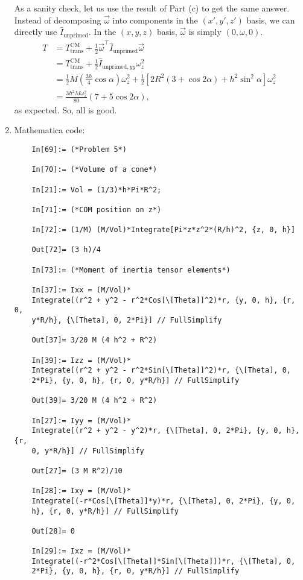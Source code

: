 \documentclass{article}
\theoremstyle{definition}
\newcommand{\al}{\alpha}
\newcommand{\f}[2]{\frac{#1}{#2}}
\newcommand{\lp}{\left(}
\newcommand{\rp}{\right)}
\newcommand{\lb}{\left[}
\newcommand{\rb}{\right]}
\begin{document}
\begin{enumerate}[label=(\alph*)]
	
	As a sanity check, let us use the result of Part (c) to get the same answer. Instead of decomposing $\vec{\omega}$ into components in the $(x',y',z')$ basis, we can directly use $\hat{I}_\text{unprimed}$. In the $(x,y,z)$ basis, $\vec{\omega}$ is simply $(0,\omega,0)$. 
	\begin{align*}
	T 
	&= T_{\text{trans}}^\text{CM} + \f{1}{2}\vec{\omega}^\top \hat{I}_\text{unprimed} \vec{\omega}\\
	&= T_{\text{trans}}^\text{CM} + \f{1}{2} \hat{I}_{\text{unprimed},yy}\omega_z^2\\
	&= \f{1}{2} M \lp \f{3h}{4}\cos\al \rp \omega_z^2 
	+ \f{1}{2}\lb 2R^2(3+\cos 2\al) + h^2 \sin^2\al \rb \omega_z^2 \\
	&= \f{3h^2 M \omega_z^2}{80}\lp 7 + 5\cos 2\al \rp,
	\end{align*}
	as expected. So, all is good.
	
	\item Mathematica code:
	\begin{lstlisting}
	In[69]:= (*Problem 5*)
	
	In[70]:= (*Volume of a cone*)
	
	In[21]:= Vol = (1/3)*h*Pi*R^2;
	
	In[71]:= (*COM position on z*)
	
	In[72]:= (1/M) (M/Vol)*Integrate[Pi*z*z^2*(R/h)^2, {z, 0, h}]
	
	Out[72]= (3 h)/4
	
	In[73]:= (*Moment of inertia tensor elements*)
	
	In[37]:= Ixx = (M/Vol)*
	Integrate[(r^2 + y^2 - r^2*Cos[\[Theta]]^2)*r, {y, 0, h}, {r, 0, 
	y*R/h}, {\[Theta], 0, 2*Pi}] // FullSimplify
	
	Out[37]= 3/20 M (4 h^2 + R^2)
	
	In[39]:= Izz = (M/Vol)*
	Integrate[(r^2 + y^2 - r^2*Sin[\[Theta]]^2)*r, {\[Theta], 0, 
	2*Pi}, {y, 0, h}, {r, 0, y*R/h}] // FullSimplify
	
	Out[39]= 3/20 M (4 h^2 + R^2)
	
	In[27]:= Iyy = (M/Vol)*
	Integrate[(r^2 + y^2 - y^2)*r, {\[Theta], 0, 2*Pi}, {y, 0, h}, {r, 
	0, y*R/h}] // FullSimplify
	
	Out[27]= (3 M R^2)/10
	
	In[28]:= Ixy = (M/Vol)*
	Integrate[(-r*Cos[\[Theta]]*y)*r, {\[Theta], 0, 2*Pi}, {y, 0, 
	h}, {r, 0, y*R/h}] // FullSimplify
	
	Out[28]= 0
	
	In[29]:= Ixz = (M/Vol)*
	Integrate[(-r^2*Cos[\[Theta]]*Sin[\[Theta]])*r, {\[Theta], 0, 
	2*Pi}, {y, 0, h}, {r, 0, y*R/h}] // FullSimplify
	

\end{lstlisting}
\end{enumerate}
\end{document}
